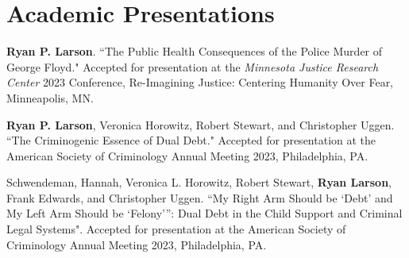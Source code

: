 \documentclass[letterpaper]{article}
\renewenvironment{itemize}{
  \begin{list}{}{
    \setlength{\leftmargin}{1.5em}
  }
}{
  \end{list}
}
\begin{document}
\section*{\textbf{Academic Presentations}}
\begin{itemize}

\item \textbf{Ryan P. Larson}. ``The Public Health Consequences of the Police Murder of George Floyd." Accepted for presentation at the \textit{Minnesota Justice Research Center} 2023 Conference, Re-Imagining Justice: Centering Humanity Over Fear, Minneapolis, MN.   

\item \textbf{Ryan P. Larson}, Veronica Horowitz, Robert Stewart, and Christopher Uggen. ``The Criminogenic Essence of Dual Debt." Accepted for presentation at the American Society of Criminology Annual Meeting 2023, Philadelphia, PA. 

\item Schwendeman, Hannah, Veronica L. Horowitz, Robert Stewart, \textbf{Ryan Larson}, Frank Edwards, and Christopher Uggen. ``My Right Arm Should be ‘Debt’ and My Left Arm Should be ‘Felony’”:
Dual Debt in the Child Support and Criminal Legal Systems". Accepted for presentation at the American Society of Criminology Annual Meeting 2023, Philadelphia, PA. 


\end{itemize}
\end{document}
